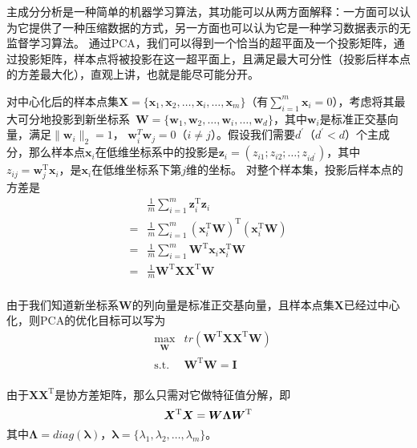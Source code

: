 \documentclass[a4paper,oneside,12pt]{book}
\begin{document}
主成分分析是一种简单的机器学习算法，其功能可以从两方面解释：一方面可以认为它提供了一种压缩数据的方式，另一方面也可以认为它是一种学习数据表示的无监督学习算法。\cite{Goodfellow2016DeepLearning}
通过PCA，我们可以得到一个恰当的超平面及一个投影矩阵，通过投影矩阵，样本点将被投影在这一超平面上，且满足最大可分性（投影后样本点的方差最大化），直观上讲，也就是能尽可能分开。

对中心化后的样本点集$\bm{X}=\{\bm{x}_1,\bm{x}_2,\ldots,\bm{x}_i,\ldots,\bm{x}_m\}$（有$\sum_{i=1}^{m}\bm{x}_i = 0$），考虑将其最大可分地投影到新坐标系\ $\bm{W}= \{\bm{w}_1,\bm{w}_2,\ldots,\bm{w}_i,\ldots,\bm{w}_d\} $，其中$\bm{w}_i$是标准正交基向量，满足$\|\bm{w}_i\|_2 = 1$， $\bm{w}_i^T\bm{w}_j = 0$（$i \not= j$）。假设我们需要$d^\prime$（$d^\prime < d$）个主成分，那么样本点$\bm{x}_i$在低维坐标系中的投影是$\bm{z}_i = (z_{i1};z_{i2};\ldots;z_{id^\prime})$，其中$z_{ij} = \bm{w}_j^\mathrm{T}\bm{x}_i$，是$\bm{x}_i$在低维坐标系下第$j$维的坐标。
对整个样本集，投影后样本点的方差是
\begin{equation}
\begin{aligned}
    & \frac{1}{m}\sum_{i=1}^m \bm{z}_i^\mathrm{T}\bm{z}_i \\
= & \frac{1}{m}\sum_{i=1}^m (\bm{x}_i^\mathrm{T}\bm{W})^\mathrm{T}(\bm{x}_i^\mathrm{T}\bm{W}) \\
= & \frac{1}{m}\sum_{i=1}^m \bm{W}^\mathrm{T}\bm{x}_i\bm{x}_i^\mathrm{T}\bm{W} \\
= & \frac{1}{m} \bm{W}^\mathrm{T}\bm{X}\bm{X}^\mathrm{T}\bm{W} \\
\end{aligned}
\end{equation}

由于我们知道新坐标系$\bm{W}$的列向量是标准正交基向量，且样本点集$\bm{X}$已经过中心化，则PCA的优化目标可以写为
\begin{equation}
\label{PCA_goal}
\begin{aligned}
& \max_{\substack{\bm{W}}}  &  tr(\bm{W}^\mathrm{T}\bm{X}\bm{X}^ \mathrm{T}\bm{W}) \\
& \operatorname{ s.t. }  &  \bm{W}^\mathrm{T}\bm{W} = \bm{I} \\
\end{aligned}
\end{equation}

由于$\bm{X}\bm{X}^ \mathrm{ T }$是协方差矩阵，那么只需对它做特征值分解，即
\begin{equation}
\label{PCA_eigenvalue}
\bm{X}^ \mathrm{ T }\bm{X} = \bm{W}\bm{\Lambda}\bm{W}^ \mathrm{ T } \\
\end{equation}
其中$\bm{\Lambda}=diag(\bm{\lambda})$，$\bm{\lambda} = \{\lambda_1,\lambda_2,\ldots,\lambda_m\}$。
\end{document}
